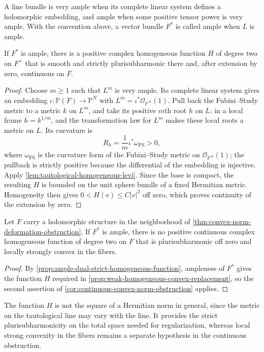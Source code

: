 A line bundle is very ample when its complete linear system defines a holomorphic embedding, and ample when some positive tensor power is very ample. With the convention above, a vector bundle $F^*$ is called ample when $L$ is ample.

\begin{proposition}\label{prop:ample-dual-strict-homogeneous-function}
If $F^*$ is ample, there is a positive complex homogeneous function $H$ of degree two on $F^\times$ that is smooth and strictly plurisubharmonic there and, after extension by zero, continuous on $F$.
\end{proposition}
\begin{proof}
Choose $m\geq1$ such that $L^m$ is very ample. Its complete linear system gives an embedding $\iota\colon\mathbb P(F)\to\mathbb P^N$ with $L^m=\iota^*\mathcal O_{\mathbb P^N}(1)$. Pull back the Fubini--Study metric to a metric $k$ on $L^m$, and take its positive $m$th root $h$ on $L$: in a local frame $h=k^{1/m}$, and the transformation law for $L^m$ makes these local roots a metric on $L$. Its curvature is
\[
 R_h=\frac1m\iota^*\omega_{\mathrm{FS}}>0,
\]
where $\omega_{\mathrm{FS}}$ is the curvature form of the Fubini--Study metric on $\mathcal O_{\mathbb P^N}(1)$; the pullback is strictly positive because the differential of the embedding is injective. Apply \cref{lem:tautological-homogeneous-levi}. Since the base is compact, the resulting $H$ is bounded on the unit sphere bundle of a fixed Hermitian metric. Homogeneity then gives $0<H(v)\leq C|v|^2$ off zero, which proves continuity of the extension by zero.
\end{proof}

\begin{corollary}\label{cor:ample-dual-continuous-convex-obstruction}
Let $F$ carry a holomorphic structure in the neighborhood of \cref{thm:convex-norm-deformation-obstruction}. If $F^*$ is ample, there is no positive continuous complex homogeneous function of degree two on $F$ that is plurisubharmonic off zero and locally strongly convex in the fibers.
\end{corollary}
\begin{proof}
By \cref{prop:ample-dual-strict-homogeneous-function}, ampleness of $F^*$ gives the function $H$ required in \cref{prop:weak-homogeneous-convex-replacement}, so the second assertion of \cref{cor:continuous-convex-norm-obstruction} applies.
\end{proof}

The function $H$ is not the square of a Hermitian norm in general, since the metric on the tautological line may vary with the line. It provides the strict plurisubharmonicity on the total space needed for regularization, whereas local strong convexity in the fibers remains a separate hypothesis in the continuous obstruction.
